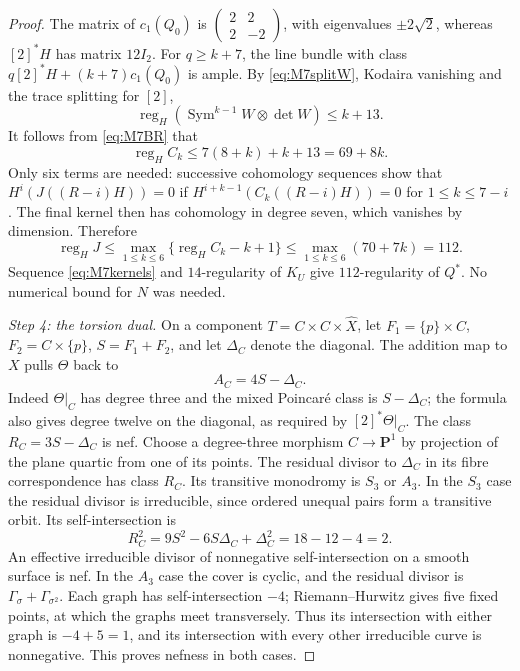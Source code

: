 \begin{proof}
The matrix of $c_1(Q_0)$ is
$\left(\begin{smallmatrix}2&2\\2&-2\end{smallmatrix}\right)$,
with eigenvalues $\pm2\sqrt2$, whereas $[2]^*H$ has matrix $12I_2$.
For $q\ge k+7$, the line bundle with class
$q[2]^*H+(k+7)c_1(Q_0)$ is ample.
By \eqref{eq:M7splitW}, Kodaira vanishing and the trace splitting
for $[2]$,
\[
 \operatorname{reg}_H
   (\operatorname{Sym}^{k-1}W\otimes\det W)\le k+13.
\]
It follows from \eqref{eq:M7BR} that
\[
 \operatorname{reg}_H C_k\le7(8+k)+k+13=69+8k.
\]
Only six terms are needed: successive cohomology sequences show that
$H^i(J((R-i)H))=0$ if
$H^{i+k-1}(C_k((R-i)H))=0$ for $1\le k\le7-i$.
The final kernel then has cohomology in degree seven, which vanishes
by dimension. Therefore
\[
 \operatorname{reg}_H J
 \le\max_{1\le k\le6}\{\operatorname{reg}_H C_k-k+1\}
 \le\max_{1\le k\le6}(70+7k)=112.
\]
Sequence \eqref{eq:M7kernels} and $14$-regularity of $K_U$ give
$112$-regularity of $Q^*$. No numerical bound for $N$ was needed.

\emph{Step 4: the torsion dual.}
On a component $T=C\times C\times\widehat X$, let
$F_1=\{p\}\times C$, $F_2=C\times\{p\}$,
$S=F_1+F_2$, and let $\Delta_C$ denote the diagonal.
The addition map to $X$ pulls $\Theta$ back to
\[
 A_C=4S-\Delta_C.
\]
Indeed $\Theta|_C$ has degree three and the mixed Poincar\'e class
is $S-\Delta_C$; the formula also gives degree twelve on the diagonal,
as required by $[2]^*\Theta|_C$.
The class $R_C=3S-\Delta_C$ is nef. Choose a degree-three morphism
$C\to\mathbf P^1$ by projection of the plane quartic from one of its
points. The residual divisor to $\Delta_C$ in its fibre correspondence
has class $R_C$. Its transitive monodromy is $S_3$ or $A_3$.
In the $S_3$ case the residual divisor is irreducible, since ordered
unequal pairs form a transitive orbit. Its self-intersection is
\[
 R_C^2=9S^2-6S\Delta_C+\Delta_C^2=18-12-4=2.
\]
An effective irreducible divisor of nonnegative self-intersection on a
smooth surface is nef. In the $A_3$ case the cover is cyclic, and the
residual divisor is $\Gamma_\sigma+\Gamma_{\sigma^2}$.
Each graph has self-intersection $-4$; Riemann--Hurwitz gives five
fixed points, at which the graphs meet transversely.
Thus its intersection with either graph is $-4+5=1$, and its
intersection with every other irreducible curve is nonnegative.
This proves nefness in both cases.


\end{proof}
